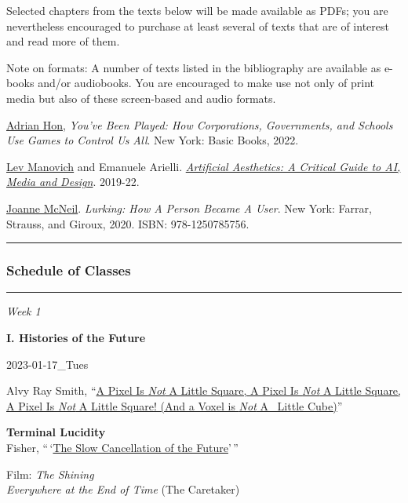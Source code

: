 \documentclass[
  letterpaper,
  DIV=11,
  numbers=noendperiod]{scrartcl}
\begin{document}
Selected chapters from the texts below will be made available as PDFs;
you are nevertheless encouraged to purchase at least several of texts
that are of interest and read more of them.

Note on formats: A number of texts listed in the bibliography are
available as e-books and/or audiobooks. You are encouraged to make use
not only of print media but also of these screen-based and audio
formats.

\href{https://mssv.net/}{Adrian Hon}, \emph{You've Been Played: How
Corporations, Governments, and Schools Use Games to Control Us All}. New
York: Basic Books, 2022.

\href{https://manovich.net/}{Lev Manovich} and Emanuele Arielli.
\href{http://manovich.net/index.php/projects/artificial-aesthetics-book}{\emph{Artificial
Aesthetics: A Critical Guide to AI, Media and Design}}. 2019-22.

\href{https://joannemcneil.com/}{Joanne McNeil}. \emph{Lurking: How A
Person Became A User}. New York: Farrar, Strauss, and Giroux, 2020.
ISBN: 978-1250785756.

\begin{center}\rule{0.5\linewidth}{0.5pt}\end{center}

\hypertarget{schedule-of-classes}{%
\subsubsection{Schedule of Classes}\label{schedule-of-classes}}

\begin{center}\rule{0.5\linewidth}{0.5pt}\end{center}

\emph{Week 1}

\textbf{I. Histories of the Future}

2023-01-17\_Tues

Alvy Ray Smith,
``\href{https://canvas.emerson.edu/courses/1932613/files/144544398?wrap=1}{A
Pixel Is \emph{Not} A Little Square, A Pixel Is \emph{Not} A Little
Square, A Pixel Is \emph{Not} A Little Square! (And a Voxel is
\emph{Not} A~ Little Cube)}''

\textbf{Terminal Lucidity}\\
Fisher,
``\,`\href{https://canvas.emerson.edu/courses/1932613/files/144544397?wrap=1}{The
Slow Cancellation of the Future}'\,''

Film: \emph{The Shining}\\
\emph{Everywhere at the End of Time} (The Caretaker)
\end{document}
